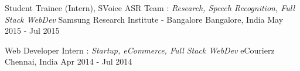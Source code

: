 \begin{cventries}
  \cventry
    {Student Trainee (Intern), SVoice ASR Team : \textit{Research, Speech Recognition, Full Stack WebDev}} %
    {Samsung Research Institute - Bangalore} %
    {Bangalore, India} %
    {May 2015 - Jul 2015} %
    {
    }

  \cventry
    {Web Developer Intern : \textit{Startup, eCommerce, Full Stack WebDev}} %
    {eCourierz} %
    {Chennai, India} %
    {Apr 2014 - Jul 2014} %
    {
    }

\end{cventries}
